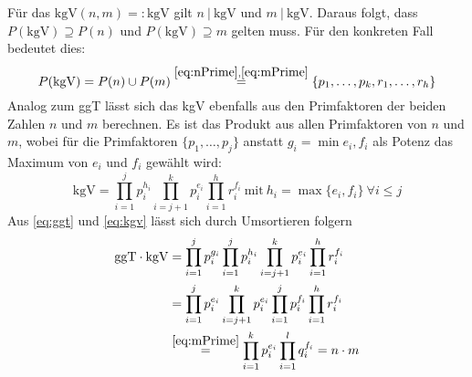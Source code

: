 \documentclass[DIN, pagenumber=false, fontsize=11pt, parskip=half]{scrartcl}
\newcommand{\ggt}{\text{ggT}}
\newcommand{\kgv}{\text{kgV}}
\begin{document}
\begin{enumerate}[label=\alph*)]
        Für das $\kgv(n, m) =: \kgv$ gilt $n \ | \ \kgv$ und $m \ | \ \kgv$. Daraus folgt, dass $P(\kgv) \supseteq P(n)$ und $P(\kgv) \supseteq m$ gelten muss.
        Für den konkreten Fall bedeutet dies:
        \begin{equation}
            P(\kgv) = P(n) \cup P(m) \stackrel{\ref{eq:nPrime}, \ref{eq:mPrime}}{=} \{p_1, \dots, p_k, r_1, \dots, r_h\} \label{eq:PkgV}
        \end{equation}
        Analog zum ggT lässt sich das kgV ebenfalls aus den Primfaktoren der beiden Zahlen $n$ und $m$ berechnen. Es ist das Produkt aus allen Primfaktoren
        von $n$ und $m$, wobei für die Primfaktoren $\{p_1, \dots, p_j\}$ anstatt $g_i = \min{e_i, f_i}$ als Potenz das Maximum von $e_i$ und $f_i$ gewählt wird:
        \begin{equation}
            \kgv = \prod_{i=1}^j{p_i^{h_i}} \prod_{i=j+1}^k{p_i^{e_i}} \prod_{i=1}^h{r_i^{f_i}} \ 
            \text{mit} \ h_i = \max\{e_i, f_i\} \ \forall i \leq j \label{eq:kgv}
        \end{equation}
        Aus \cref{eq:ggt} und \ref{eq:kgv} lässt sich durch Umsortieren folgern
        \begin{align}
            \ggt\cdot \kgv &= \prod_{i=1}^j{p_i^{g_i}} \prod_{i=1}^j{p_i^{h_i}} \prod_{i=j+1}^k{p_i^{e_i}} \prod_{i=1}^h{r_i^{f_i}} \\
            &= \prod_{i=1}^j{p_i^{e_i}} \prod_{i=j+1}^k{p_i^{e_i}} \prod_{i=1}^j{p_i^{f_i}} \prod_{i=1}^h{r_i^{f_i}} \\
            &\stackrel{\ref{eq:mPrime}}{=} \prod_{i=1}^k{p_i^{e_i}} \prod_{i=1}^l{q_i^{f_i}} = n \cdot m \label{eq:ggtTimeskgv}
        \end{align}


\end{enumerate}
\end{document}
